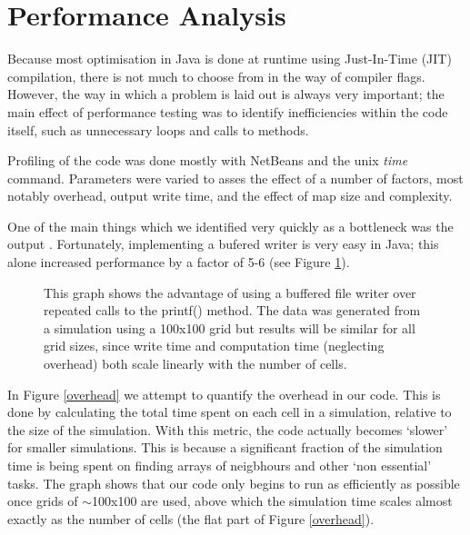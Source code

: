 \section{Performance Analysis} %
   
    Because most optimisation in Java is done at runtime using Just-In-Time (JIT) compilation, there is not much to choose from in the way
  	 of compiler flags. However, the way in which a problem is laid out is always very important; the main effect of performance testing
 	 was to identify inefficiencies within the code itself, such as unnecessary loops and calls to methods.\newline{}
 	
 	 Profiling of the code was done mostly with NetBeans and the unix \emph{time} command. Parameters were varied to asses the effect of a number of 
 	 factors, most notably overhead, output write time, and the effect of map size and complexity.\newline{}
 
 	 One of the main things which we identified	very quickly as a bottleneck was the output . Fortunately, implementing a bufered writer is
	 very easy in Java; this alone increased performance by a factor of 5-6 (see Figure \ref{buffering}).\newline{}
	
  \begin{figure}[H]
  
  \caption{\label{buffering}This graph shows the advantage of using a buffered file writer over repeated calls to the printf() method. 
  The data was generated from a simulation using a 100x100 grid but results will be similar for all grid sizes, since write time and computation
  time (neglecting overhead) both scale linearly with the number of cells. }
  \end{figure} 

	 In Figure \ref{overhead} we attempt to quantify the overhead in our code. This is done by calculating the total time spent on each cell in a 
	 simulation, relative to the size of the simulation. With this metric, the code actually becomes `slower' for smaller simulations. This is 
	 because a significant fraction of the simulation time is being spent on finding arrays of neigbhours and other `non essential' tasks. The graph
	 shows that our code only begins to run as efficiently as possible once grids of $\sim$100x100 are used, above which the simulation time scales
	 almost exactly as the number of cells (the flat part of Figure \ref{overhead}).\newline{}
	 
